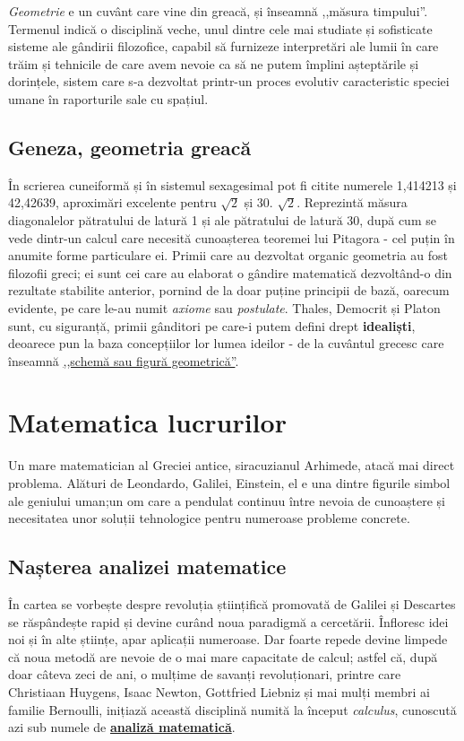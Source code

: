 \documentclass{article}
\begin{document}
\textit{Geometrie} e un cuvânt care vine din greacă, și înseamnă ,,măsura timpului”. Termenul indică o disciplină veche, unul dintre cele mai studiate și sofisticate sisteme ale gândirii filozofice, capabil să furnizeze interpretări ale lumii în care trăim și tehnicile de care avem nevoie ca să ne putem împlini așteptările și dorințele, sistem care s-a dezvoltat printr-un proces evolutiv caracteristic speciei umane în raporturile sale cu spațiul.

\subsection{Geneza, geometria greacă}


În scrierea cuneiformă și în sistemul sexagesimal pot fi citite numerele 1,414213 și 42,42639, aproximări excelente pentru $\sqrt{2}$ și 30. $\sqrt{2}$. Reprezintă măsura diagonalelor pătratului de latură 1 și ale pătratului de latură 30, după cum se vede dintr-un calcul care necesită cunoașterea teoremei lui Pitagora - cel puțin în anumite forme particulare ei. Primii care au dezvoltat organic geometria au fost filozofii greci; ei sunt cei care au elaborat o gândire matematică dezvoltând-o din rezultate stabilite anterior, pornind de la doar puține principii de bază, oarecum evidente, pe care le-au numit \textit{axiome} sau \textit{postulate}. Thales, Democrit și Platon sunt, cu siguranță, primii gânditori pe care-i putem defini drept \textbf{idealiști}, deoarece pun la baza concepțiilor lor lumea ideilor - de la cuvântul grecesc care înseamnă \underline{,,schemă sau figură geometrică”}.

\section{Matematica lucrurilor}

Un mare matematician al Greciei antice, siracuzianul Arhimede, atacă mai direct problema. Alături de Leondardo, Galilei, Einstein, el e una dintre figurile simbol ale geniului uman;un om care a pendulat continuu între nevoia de cunoaștere și necesitatea unor soluții tehnologice pentru numeroase probleme concrete.

\subsection{Nașterea analizei matematice}

În cartea \cite {Andreatta} se vorbește despre revoluția științifică promovată de Galilei și Descartes se răspândește rapid și devine curând noua paradigmă a cercetării. Înfloresc idei noi și în alte științe, apar aplicații numeroase. Dar foarte repede devine limpede că noua metodă are nevoie de o mai mare capacitate de calcul; astfel că, după doar câteva zeci de ani, o mulțime de savanți revoluționari, printre care Christiaan Huygens, Isaac Newton, Gottfried Liebniz și mai mulți membri ai familie Bernoulli, inițiază această disciplină numită la început \textit{calculus}, cunoscută azi sub numele de \textbf{\underline {analiză matematică}}.
\end{document}
